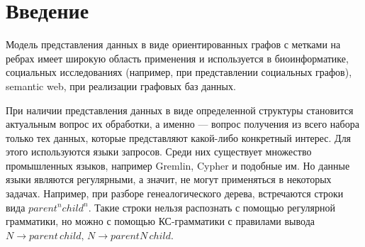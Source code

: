 \documentclass[14pt]{matmex-diploma-custom}
\begin{document}
\maketitle
\tableofcontents

\section*{Введение}
	Модель представления данных в виде ориентированных графов с метками на ребрах имеет широкую область применения и используется в биоинформатике, социальных исследованиях (например, при представлении социальных графов), semantic web, при реализации графовых баз данных. 
	
	При наличии представления данных в виде определенной структуры становится актуальным вопрос их обработки, а именно --- вопрос получения из всего набора только тех данных, которые представляют какой-либо конкретный интерес. Для этого используются языки запросов. Среди них существует множество промышленных языков, например Gremlin\cite{Gremlin}, Cypher\cite{Cypher} и подобные им. Но данные языки являются регулярными, а значит, не могут применяться в некоторых задачах. Например, при разборе генеалогического дерева, встречаются строки вида \(parent^nchild^n\). Такие строки нельзя распознать с помощью регулярной грамматики, но можно с помощью КС-грамматики с правилами вывода \(N \to parent\,child, \,N \to parentN\, child\). 
	
\end{document}
